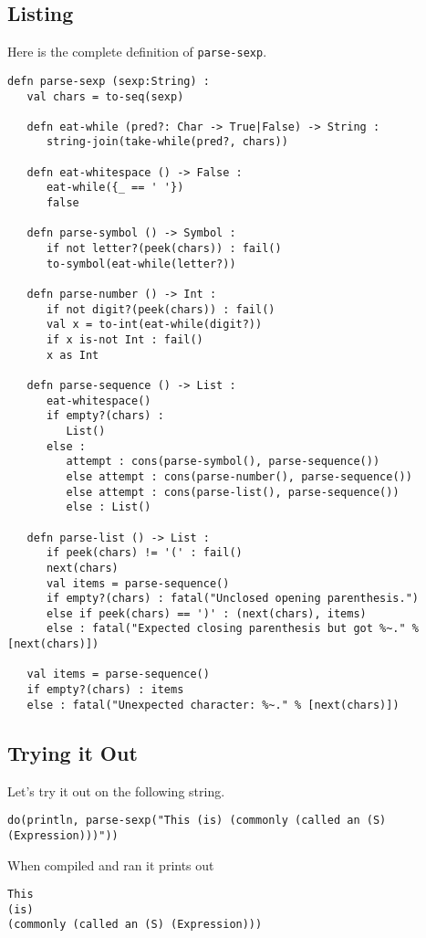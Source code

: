 \documentclass[10pt,oneside]{book}
\begin{document}
\subsection*{Listing}
Here is the complete definition of \texttt{\frenchspacing parse-sexp}.
\begin{lstlisting}
defn parse-sexp (sexp:String) :
   val chars = to-seq(sexp)

   defn eat-while (pred?: Char -> True|False) -> String :
      string-join(take-while(pred?, chars))

   defn eat-whitespace () -> False :
      eat-while({_ == ' '})
      false
   
   defn parse-symbol () -> Symbol :
      if not letter?(peek(chars)) : fail()
      to-symbol(eat-while(letter?))
         
   defn parse-number () -> Int :
      if not digit?(peek(chars)) : fail()
      val x = to-int(eat-while(digit?))
      if x is-not Int : fail()
      x as Int

   defn parse-sequence () -> List :
      eat-whitespace()
      if empty?(chars) :
         List()
      else :
         attempt : cons(parse-symbol(), parse-sequence())
         else attempt : cons(parse-number(), parse-sequence())
         else attempt : cons(parse-list(), parse-sequence())
         else : List()
      
   defn parse-list () -> List :   
      if peek(chars) != '(' : fail()
      next(chars)
      val items = parse-sequence()
      if empty?(chars) : fatal("Unclosed opening parenthesis.")
      else if peek(chars) == ')' : (next(chars), items)
      else : fatal("Expected closing parenthesis but got %~." % [next(chars)])

   val items = parse-sequence()
   if empty?(chars) : items
   else : fatal("Unexpected character: %~." % [next(chars)])
\end{lstlisting}

\subsection*{Trying it Out}
Let's try it out on the following string.
\begin{lstlisting}
do(println, parse-sexp("This (is) (commonly (called an (S) (Expression)))"))
\end{lstlisting}
When compiled and ran it prints out
\begin{lstlisting}
This
(is)
(commonly (called an (S) (Expression)))
\end{lstlisting}
\end{document}

